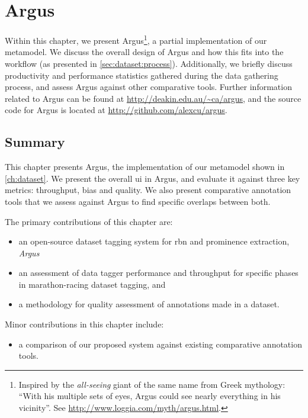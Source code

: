 \chapter{Argus}
\label{ch:argus}

Within this chapter, we present Argus\footnote{Inspired by the \textit{all-seeing} giant of the same name from Greek mythology: ``With his multiple sets of eyes, Argus could see nearly everything in his vicinity''. See \url{http://www.loggia.com/myth/argus.html}.}, a partial implementation of our metamodel. We discuss the overall design of Argus and how this fits into the workflow (as presented in \cref{sec:dataset:process}). Additionally, we briefly discuss productivity and performance statistics gathered during the data gathering process, and assess Argus against other comparative tools. Further information related to Argus can be found at \url{http://deakin.edu.au/~ca/argus}, and the source code for Argus is located at \url{http://github.com/alexcu/argus}.





\section{Summary}

This chapter presents Argus, the implementation of our metamodel shown in \cref{ch:dataset}. We present the overall \gls{ui} in Argus, and evaluate it against three key metrics: throughput, bias and quality. We also present comparative annotation tools that we assess against Argus to find specific overlaps between both.

\bigskip

\noindent
The primary contributions of this chapter are:

\begin{itemize}
  \item an open-source dataset tagging system for \gls{rbn} and prominence extraction, \textit{Argus}
  \item an assessment of data tagger performance and throughput for specific phases in marathon-racing dataset tagging, and
  \item a methodology for quality assessment of annotations made in a dataset.
\end{itemize}

\noindent
Minor contributions in this chapter include:

\begin{itemize}
  \item a comparison of our proposed system against existing comparative annotation tools.
\end{itemize}